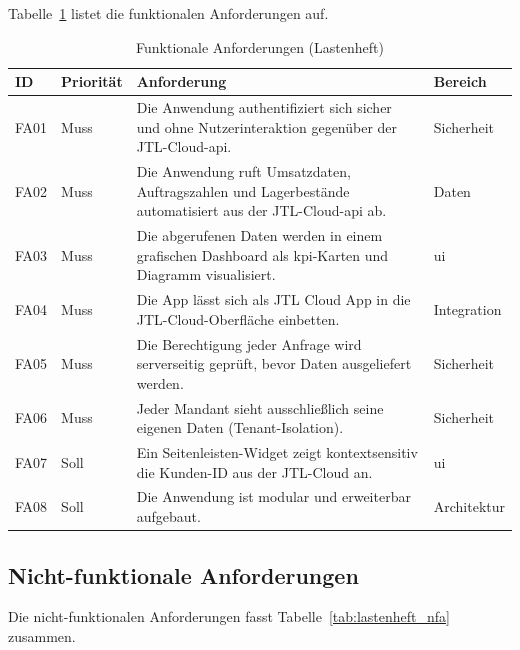 \documentclass[11pt, a4paper, oneside]{report}
\begin{document}
Tabelle~\ref{tab:lastenheft_fa} listet die funktionalen Anforderungen auf.

\begin{table}[H]
  \centering
  \caption{Funktionale Anforderungen (Lastenheft)}
  \label{tab:lastenheft_fa}
  \begin{tabularx}{\textwidth}{l l X l}
    \toprule
    \textbf{ID} & \textbf{Priorität} & \textbf{Anforderung} & \textbf{Bereich} \\
    \midrule
    FA01 & Muss & Die Anwendung authentifiziert sich sicher und ohne
                  Nutzerinteraktion gegenüber der JTL-Cloud-\gls{api}. & Sicherheit \\
    FA02 & Muss & Die Anwendung ruft Umsatzdaten, Auftragszahlen und
                  Lagerbestände automatisiert aus der JTL-Cloud-\gls{api} ab. & Daten \\
    FA03 & Muss & Die abgerufenen Daten werden in einem grafischen Dashboard
                  als \gls{kpi}-Karten und Diagramm visualisiert. & \gls{ui} \\
    FA04 & Muss & Die App lässt sich als JTL Cloud App in die
                  JTL-Cloud-Oberfläche einbetten. & Integration \\
    FA05 & Muss & Die Berechtigung jeder Anfrage wird serverseitig geprüft,
                  bevor Daten ausgeliefert werden. & Sicherheit \\
    FA06 & Muss & Jeder Mandant sieht ausschließlich seine eigenen Daten
                  (Tenant-Isolation). & Sicherheit \\
    FA07 & Soll & Ein Seitenleisten-Widget zeigt kontextsensitiv die
                  Kunden-ID aus der JTL-Cloud an. & \gls{ui} \\
    FA08 & Soll & Die Anwendung ist modular und erweiterbar aufgebaut. & Architektur \\
    \bottomrule
  \end{tabularx}
\end{table}

\subsection*{Nicht-funktionale Anforderungen}

Die nicht-funktionalen Anforderungen fasst Tabelle~\ref{tab:lastenheft_nfa} zusammen.
\end{document}
